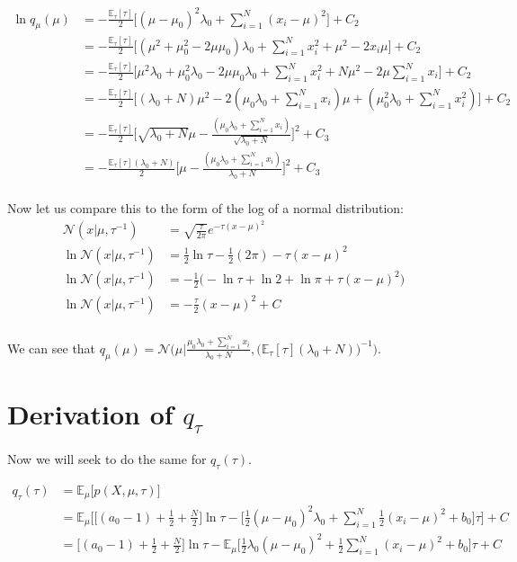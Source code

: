 \documentclass[11pt]{article}
\begin{document}
\begin{align*}
\ln q_\mu(\mu) &= -\frac{\mathbb{E}_\tau [\tau]}{2} \big[ (\mu - \mu_0)^2 \lambda_0 + \sum_{i=1}^N (x_i - \mu)^2 \big] + C_2 \\
&= -\frac{\mathbb{E}_\tau [\tau]}{2} \big[ (\mu^2 + \mu_0^2 - 2\mu\mu_0) \lambda_0 + \sum_{i=1}^N x_i^2 + \mu^2 - 2x_i\mu \big] + C_2 \\
&= -\frac{\mathbb{E}_\tau [\tau]}{2} \big[ \mu^2\lambda_0 + \mu_0^2\lambda_0 - 2\mu\mu_0\lambda_0 + \sum_{i=1}^N x_i^2 + N \mu^2 - 2\mu \sum_{i=1}^N x_i \big] + C_2 \\
&= -\frac{\mathbb{E}_\tau [\tau]}{2} \big[ (\lambda_0 + N)\mu^2 - 2(\mu_0\lambda_0 + \sum_{i=1}^N x_i)\mu + (\mu_0^2\lambda_0 + \sum_{i=1}^N x_i^2 ) \big] + C_2 \\
&= -\frac{\mathbb{E}_\tau [\tau]}{2} \big[ \sqrt{\lambda_0 + N}\mu - \frac{(\mu_0\lambda_0 + \sum_{i=1}^N x_i)}{\sqrt{\lambda_0 + N}} \big]^2 + C_3 \\
&= -\frac{\mathbb{E}_\tau [\tau](\lambda_0 + N)}{2} \big[ \mu - \frac{(\mu_0\lambda_0 + \sum_{i=1}^N x_i)}{\lambda_0 + N} \big]^2 + C_3 \\
\end{align*}

Now let us compare this to the form of the log of a normal distribution:
\begin{align*}
\mathcal{N}(x | \mu, \tau^{-1}) &= \sqrt{\frac{\tau}{2\pi}} e^{-\tau(x - \mu)^2} \\
\ln \mathcal{N}(x | \mu, \tau^{-1}) &= \frac{1}{2} \ln \tau - \frac{1}{2} (2\pi) - \tau(x - \mu)^2 \\
\ln \mathcal{N}(x | \mu, \tau^{-1}) &= -\frac{1}{2} \big( - \ln \tau + \ln 2 + \ln \pi + \tau(x - \mu)^2 \big) \\
\ln \mathcal{N}(x | \mu, \tau^{-1}) &= -\frac{\tau}{2} (x - \mu)^2 + C \\
\end{align*}

We can see that $q_\mu(\mu) = \mathcal{N} \Big(\mu | \frac{\mu_0\lambda_0 + \sum_{i=1}^{N} x_i}{\lambda_0 + N}, \big(\mathbb{E}_{\tau}[\tau](\lambda_0 + N) \big)^{-1} \Big)$.

\section{Derivation of $q_\tau$}
Now we will seek to do the same for $q_\tau(\tau)$.

\begin{align*}
q_\tau(\tau) &= \mathbb{E}_\mu \big[ p(X, \mu, \tau) \big] \\
&= \mathbb{E}_\mu \Big[ \big[ (a_0 - 1) + \frac{1}{2} + \frac{N}{2} \big] \ln \tau - \big[ \frac{1}{2}(\mu - \mu_0)^2 \lambda_0 + \sum_{i=1}^N \frac{1}{2}(x_i - \mu)^2 + b_0 \big] \tau \Big] + C \\
&= \big[ (a_0 - 1) + \frac{1}{2} + \frac{N}{2} \big] \ln \tau - \mathbb{E}_\mu \big[ \frac{1}{2}\lambda_0(\mu - \mu_0)^2 + \frac{1}{2}\sum_{i=1}^N(x_i - \mu)^2 + b_0\big] \tau + C \\
\end{align*}
\end{document}
